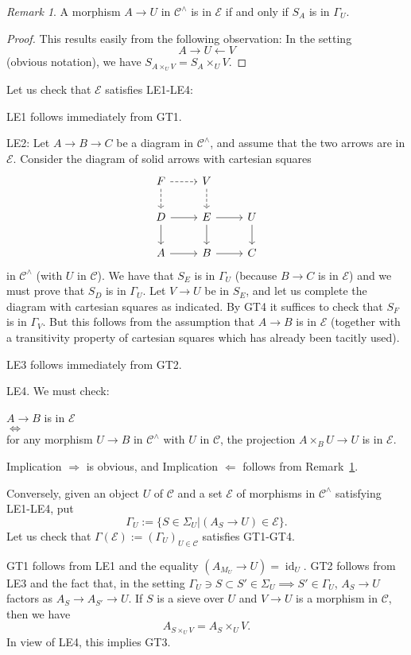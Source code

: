 \documentclass[12pt]{article}%
\theoremstyle{remark}
\newtheorem{rk}[thm]{Remark}
\theoremstyle{definition}
\newcommand{\nn}{\noindent}
\newcommand{\cc}{\mathcal}
\newcommand{\C}{\mathcal C}
\newcommand{\si}{\Leftarrow}
\newcommand{\then}{\Rightarrow}
\DeclareMathOperator{\id}{id}
\begin{document}
\begin{rk}\label{1613i}
A morphism $A\to U$ in $\C^\wedge$ is in $\cc E$ if and only if $S_A$ is in $\Gamma_U$. 
\end{rk}

\begin{proof}
This results easily from the following observation: In the setting 
$$
A\to U\leftarrow V
$$ 
(obvious notation), we have $S_{A\times_UV}=S_A\times_UV$. 
\end{proof}

Let us check that $\cc E$ satisfies LE1-LE4:

\nn LE1 follows immediately from GT1.

\nn LE2: Let $A\to B\to C$ be a diagram in $\C^\wedge$, and assume that the two arrows are in $\cc E$. Consider the diagram of solid arrows with cartesian squares 
$$
\begin{tikzcd}
F\ar[dashed]{r}\ar[dashed]{d}&V\ar[dashed]{d}\\ 
D\ar{r}\ar{d}&E\ar{r}\ar{d}&U\ar{d}\\ 
A\ar{r}&B\ar{r}&C
\end{tikzcd}
$$
in $\C^\wedge$ (with $U$ in $\C$). We have that $S_E$ is in $\Gamma_U$ (because $B\to C$ is in $\cc E$) and we must prove that $S_D$ is in $\Gamma_U$. Let $V\to U$ be in $S_E$, and let us complete the diagram with cartesian squares as indicated. By GT4 it suffices to check that $S_F$ is in $\Gamma_V$. But this follows from the assumption that $A\to B$ is in $\cc E$ (together with a transitivity property of cartesian squares which has already been tacitly used).

\nn LE3 follows immediately from GT2.

\nn LE4. We must check: 
\begin{center}
$A\to B$ is in $\cc E$\\ $\iff$\\ for any morphism $U\to B$ in $\C^\wedge$ with $U$ in $\C$, the projection $A\times_BU\to U$ is in $\cc E$.
\end{center}
Implication $\then$ is obvious, and Implication $\si$ follows from Remark~\ref{1613i}. 

Conversely, given an object $U$ of $\C$ and a set $\cc E$ of morphisms in $\C^\wedge$ satisfying LE1-LE4, put
$$
\Gamma_U:=\{S\in\Sigma_U|(A_S\to U)\in\cc E\}.
$$
Let us check that $\Gamma(\cc E):=(\Gamma_U)_{U\in\C}$ satisfies GT1-GT4.

GT1 follows from LE1 and the equality $(A_{M_U}\to U)=\id_U$. GT2 follows from LE3 and the fact that, in the setting $\Gamma_U\ni S\subset S'\in\Sigma_U\implies S'\in\Gamma_U$, $A_S\to U$ factors as $A_S\to A_{S'}\to U$. If $S$ is a sieve over $U$ and $V\to U$ is a morphism in $\C$, then we have 
%
\begin{equation}\label{asuv}
A_{S\times_UV}=A_S\times_UV.
\end{equation}
%
In view of LE4, this implies GT3.  
\end{document}

